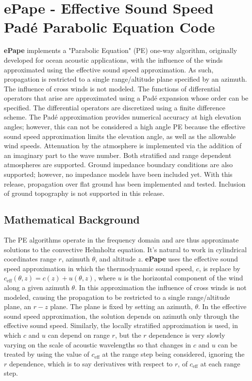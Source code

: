 \section{ePape - Effective Sound Speed Pad\'e Parabolic Equation Code}
\label{sec: ePape}

{\bf ePape} implements a "Parabolic Equation" (PE)\cite{collins2019parabolic} one-way algorithm, originally developed for ocean acoustic applications, with the influence of the winds approximated using the effective sound speed approximation. As such, propagation is restricted to a single range/altitude plane specified by an azimuth. The influence of cross winds is not modeled. The functions of differential operators that arise are approximated using a Pad\'e expansion whose order can be specified. The differential operators are discretized using a finite difference scheme. The Pad\'e approximation provides numerical accuracy at high elevation angles; however, this can not be considered a high angle PE because the effective sound speed approximation limits the elevation angle, as well as the allowable wind speeds. Attenuation by the atmosphere is implemented via the addition of an imaginary part to the wave number. Both stratified and range dependent atmospheres are supported. Ground impedance boundary conditions are also supported; however, no impedance models have been included yet. With this release, propagation over flat ground has been implemented and tested. Inclusion of ground topography is not supported in this release.

\subsection{Mathematical Background}
The PE algorithms operate in the frequency domain and are thus approximate solutions to the convective Helmholtz equation. It's natural to work in cylindrical coordinates range $r$, azimuth $\theta$, and altitude $z$. {\bf ePape} uses the effective sound speed approximation\cite{waxler2019propagation} in which the thermodynamic sound speed, $c$, is replace by $c_{\text{eff}}(\theta,z)=c(z)+u(\theta,z)$, where $u$ is the horizontal component of the wind along a given azimuth $\theta$. In this approximation the influence of cross winds is not modeled, causing the propagation to be restricted to a single range/altitude plane, an $r-z$ plane. The plane is fixed by setting an azimuth, $\theta$. In the effective sound speed approximation, the solution depends on azimuth only through the effective sound speed. Similarly, the locally stratified approximation is used, in which $c$ and $u$ can depend on range $r$, but the $r$ dependence is very slowly varying on the scale of acoustic wavelengths so that changes in $c$ and $u$ can be treated by using the value of $c_{\text{eff}}$ at the range step being considered, ignoring the $r$ dependence, which is to say derivatives with respect to $r$, of $c_{\text{eff}}$ at each range step. 


